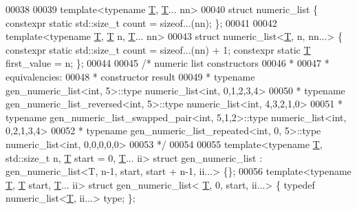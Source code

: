 \begin{DoxyCode}
00038 
00039 \textcolor{keyword}{template}<\textcolor{keyword}{typename} \hyperlink{group___sparse_core___module_class_eigen_1_1_triplet}{T}, \hyperlink{group___sparse_core___module_class_eigen_1_1_triplet}{T}... nn>
00040 \textcolor{keyword}{struct }numeric\_list \{ constexpr \textcolor{keyword}{static} std::size\_t count = \textcolor{keyword}{sizeof}...(nn); \};
00041 
00042 \textcolor{keyword}{template}<\textcolor{keyword}{typename} \hyperlink{group___sparse_core___module_class_eigen_1_1_triplet}{T}, \hyperlink{group___sparse_core___module_class_eigen_1_1_triplet}{T} n, \hyperlink{group___sparse_core___module_class_eigen_1_1_triplet}{T}... nn>
00043 \textcolor{keyword}{struct }numeric\_list<\hyperlink{group___sparse_core___module_class_eigen_1_1_triplet}{T}, n, nn...> \{ constexpr \textcolor{keyword}{static} std::size\_t count = \textcolor{keyword}{sizeof}...(nn) + 1; constexpr \textcolor{keyword}{
      static} \hyperlink{group___sparse_core___module_class_eigen_1_1_triplet}{T} first\_value = n; \};
00044 
00045 \textcolor{comment}{/* numeric list constructors}
00046 \textcolor{comment}{ *}
00047 \textcolor{comment}{ * equivalencies:}
00048 \textcolor{comment}{ *     constructor                                              result}
00049 \textcolor{comment}{ *     typename gen\_numeric\_list<int, 5>::type                  numeric\_list<int, 0,1,2,3,4>}
00050 \textcolor{comment}{ *     typename gen\_numeric\_list\_reversed<int, 5>::type         numeric\_list<int, 4,3,2,1,0>}
00051 \textcolor{comment}{ *     typename gen\_numeric\_list\_swapped\_pair<int, 5,1,2>::type numeric\_list<int, 0,2,1,3,4>}
00052 \textcolor{comment}{ *     typename gen\_numeric\_list\_repeated<int, 0, 5>::type      numeric\_list<int, 0,0,0,0,0>}
00053 \textcolor{comment}{ */}
00054 
00055 \textcolor{keyword}{template}<\textcolor{keyword}{typename} \hyperlink{group___sparse_core___module_class_eigen_1_1_triplet}{T}, std::size\_t n, \hyperlink{group___sparse_core___module_class_eigen_1_1_triplet}{T} start = 0, \hyperlink{group___sparse_core___module_class_eigen_1_1_triplet}{T}... ii> \textcolor{keyword}{struct }gen\_numeric\_list                     : 
      gen\_numeric\_list<T, n-1, start, start + n-1, ii...> \{\};
00056 \textcolor{keyword}{template}<\textcolor{keyword}{typename} \hyperlink{group___sparse_core___module_class_eigen_1_1_triplet}{T}, \hyperlink{group___sparse_core___module_class_eigen_1_1_triplet}{T} start, \hyperlink{group___sparse_core___module_class_eigen_1_1_triplet}{T}... ii>                    \textcolor{keyword}{struct }gen\_numeric\_list<
      \hyperlink{group___sparse_core___module_class_eigen_1_1_triplet}{T}, 0, start, ii...> \{ \textcolor{keyword}{typedef} numeric\_list<\hyperlink{group___sparse_core___module_class_eigen_1_1_triplet}{T}, ii...> type; \};

\end{DoxyCode}
